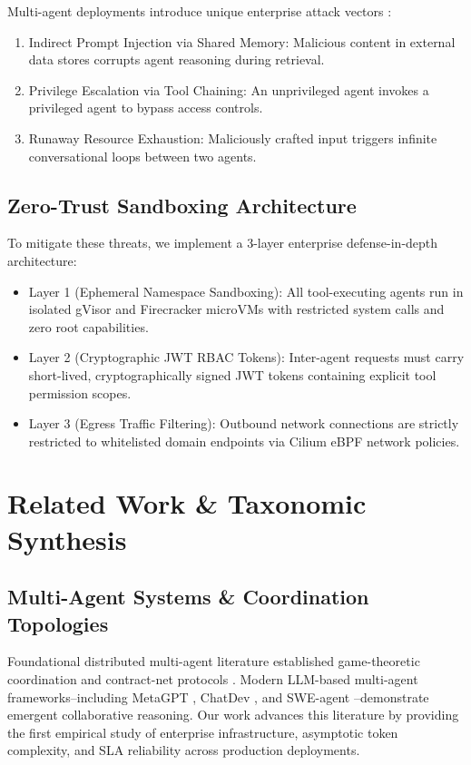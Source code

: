 \documentclass[10pt,journal,compsoc,twocolumn]{IEEEtran}
\begin{document}
Multi-agent deployments introduce unique enterprise attack vectors \cite{arxiv_2404_04289}:
\begin{enumerate}
  \item Indirect Prompt Injection via Shared Memory: Malicious content in external data stores corrupts agent reasoning during retrieval.
  \item Privilege Escalation via Tool Chaining: An unprivileged agent invokes a privileged agent to bypass access controls.
  \item Runaway Resource Exhaustion: Maliciously crafted input triggers infinite conversational loops between two agents.
\end{enumerate}


\subsection{Zero-Trust Sandboxing Architecture}


To mitigate these threats, we implement a 3-layer enterprise defense-in-depth architecture:
\begin{itemize}
  \item Layer 1 (Ephemeral Namespace Sandboxing): All tool-executing agents run in isolated gVisor and Firecracker microVMs with restricted system calls and zero root capabilities.
  \item Layer 2 (Cryptographic JWT RBAC Tokens): Inter-agent requests must carry short-lived, cryptographically signed JWT tokens containing explicit tool permission scopes.
  \item Layer 3 (Egress Traffic Filtering): Outbound network connections are strictly restricted to whitelisted domain endpoints via Cilium eBPF network policies.
\end{itemize}




\section{Related Work \& Taxonomic Synthesis}



\subsection{Multi-Agent Systems \& Coordination Topologies}

Foundational distributed multi-agent literature established game-theoretic coordination and contract-net protocols \cite{arxiv_2203_08975,arxiv_2010_11146}. Modern LLM-based multi-agent frameworks--including MetaGPT \cite{crossref_10_48550_arxiv_2308_00352}, ChatDev \cite{crossref_10_18653_v1_2024_acl_long_810}, and SWE-agent \cite{crossref_10_48550_arxiv_2405_15793}--demonstrate emergent collaborative reasoning. Our work advances this literature by providing the first empirical study of enterprise infrastructure, asymptotic token complexity, and SLA reliability across production deployments.
\end{document}
